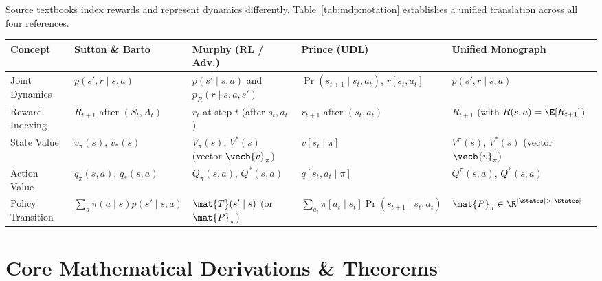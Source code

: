 \documentclass[../../../../master.tex]{subfiles}
\begin{document}
\begin{crossbook}
Source textbooks index rewards and represent dynamics differently. Table~\ref{tab:mdp:notation} establishes a unified translation across all four references.
\vspace{0.4em}
\begin{center}
\renewcommand{\arraystretch}{1.22}
\begin{tabularx}{\textwidth}{@{}l >{\raggedright\arraybackslash}X >{\raggedright\arraybackslash}X >{\raggedright\arraybackslash}X >{\raggedright\arraybackslash}X@{}}
\toprule
\textbf{Concept} & \textbf{Sutton \& Barto} & \textbf{Murphy (RL / Adv.)} & \textbf{Prince (UDL)} & \textbf{Unified Monograph} \\
\midrule
Joint Dynamics & $p(s', r \mid s, a)$ & $p(s' \mid s, a)$ and $p_R(r \mid s, a, s')$ & $\Pr(s_{t+1} \mid s_t, a_t)$, $r[s_t, a_t]$ & $p(s', r \mid s, a)$ \\
Reward Indexing & $R_{t+1}$ after $(S_t, A_t)$ & $r_t$ at step $t$ (after $s_t, a_t$) & $r_{t+1}$ after $(s_t, a_t)$ & $R_{t+1}$ (with $R(s, a) = \E[R_{t+1}]$) \\
State Value & $v_\pi(s)$, $v_*(s)$ & $V_\pi(s)$, $V^*(s)$ (vector $\vecb{v}_\pi$) & $v[s_t \mid \pi]$ & $V^\pi(s)$, $V^*(s)$ (vector $\vecb{v}_\pi$) \\
Action Value & $q_\pi(s, a)$, $q_*(s, a)$ & $Q_\pi(s, a)$, $Q^*(s, a)$ & $q[s_t, a_t \mid \pi]$ & $Q^\pi(s, a)$, $Q^*(s, a)$ \\
Policy Transition & $\sum_a \pi(a \mid s) p(s' \mid s, a)$ & $\mat{T}(s' \mid s)$ (or $\mat{P}_\pi$) & $\sum_{a_t} \pi[a_t \mid s_t] \Pr(s_{t+1} \mid s_t, a_t)$ & $\mat{P}_\pi \in \R^{|\States| \times |\States|}$ \\
\bottomrule
\end{tabularx}
\label{tab:mdp:notation}
\end{center}
\end{crossbook}

\section{Core Mathematical Derivations \& Theorems}\label{sec:mdp:derivations}
\end{document}
